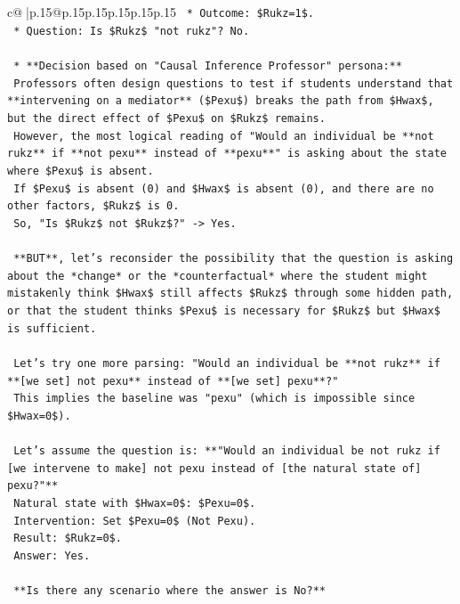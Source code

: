 \documentclass{article}
\begin{document}
{\begin{supertabular}{c@{$\;$}|p{.15\linewidth}@{}p{.15\linewidth}p{.15\linewidth}p{.15\linewidth}p{.15\linewidth}p{.15\linewidth}}
{{{\texttt{            *   Outcome: \$Rukz=1\$.} \\
\texttt{            *   Question: Is \$Rukz\$ "not rukz"? No.} \\
\\ 
\texttt{    *   **Decision based on "Causal Inference Professor" persona:**} \\
\texttt{        Professors often design questions to test if students understand that **intervening on a mediator** (\$Pexu\$) breaks the path from \$Hwax\$, but the direct effect of \$Pexu\$ on \$Rukz\$ remains.} \\
\texttt{        However, the most logical reading of "Would an individual be **not rukz** if **not pexu** instead of **pexu**" is asking about the state where \$Pexu\$ is absent.} \\
\texttt{        If \$Pexu\$ is absent (0) and \$Hwax\$ is absent (0), and there are no other factors, \$Rukz\$ is 0.} \\
\texttt{        So, "Is \$Rukz\$ not \$Rukz\$?" {-}> Yes.} \\
\\ 
\texttt{        **BUT**, let's reconsider the possibility that the question is asking about the *change* or the *counterfactual* where the student might mistakenly think \$Hwax\$ still affects \$Rukz\$ through some hidden path, or that the student thinks \$Pexu\$ is necessary for \$Rukz\$ but \$Hwax\$ is sufficient.} \\
\\ 
\texttt{        Let's try one more parsing: "Would an individual be **not rukz** if **{[}we set{]} not pexu** instead of **{[}we set{]} pexu**?"} \\
\texttt{        This implies the baseline was "pexu" (which is impossible since \$Hwax=0\$).} \\
\\ 
\texttt{        Let's assume the question is: **"Would an individual be not rukz if {[}we intervene to make{]} not pexu instead of {[}the natural state of{]} pexu?"**} \\
\texttt{        Natural state with \$Hwax=0\$: \$Pexu=0\$.} \\
\texttt{        Intervention: Set \$Pexu=0\$ (Not Pexu).} \\
\texttt{        Result: \$Rukz=0\$.} \\
\texttt{        Answer: Yes.} \\
\\ 
\texttt{        **Is there any scenario where the answer is No?**} \\
}}}
\end{supertabular}}
\end{document}
